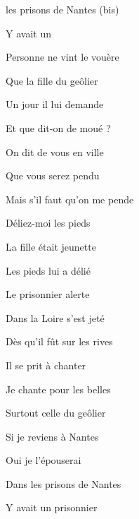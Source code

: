 \begin{SBVerse*}
 les prisons de Nantes  (bis)

Y avait un 
\end{SBVerse*}

\bigskip

Personne ne vint le \og vou\`ere \fg

Que la fille du ge\^olier

\bigskip

Un jour il lui demande

Et que dit-on de \og mou\'e \fg ?

\bigskip

On dit de vous en ville

Que vous serez pendu

\bigskip

Mais s'il faut qu'on me pende

D\'eliez-moi les pieds

\bigskip

La fille \'etait jeunette

Les pieds lui a d\'eli\'e

\bigskip

Le prisonnier alerte

Dans la Loire s'est jet\'e

\bigskip

D\`es qu'il f\^ut sur les rives

Il se prit \`a chanter

\bigskip

Je chante pour les belles

Surtout celle du ge\^olier

\bigskip

Si je reviens \`a Nantes

Oui je l'\'epouserai

\bigskip

Dans les prisons de Nantes

Y avait un prisonnier

\bigskip
